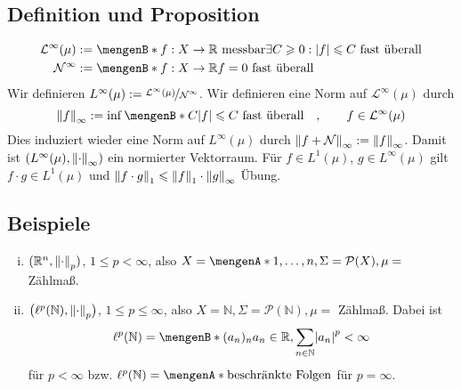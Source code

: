 \subsection[Definition und Proposition: Der normierte Raum $L^\infty(\mu)$ und ]{Definition und Proposition} %
\label{sub:48}
\begin{align*}
	\mathcal{L}^\infty(\mu) &:= \set[f : X \to \mathds{R} \text{ messbar}]{\exists C \ge 0 : \abs*{f} \le C \text{ fast überall} \rule{0cm}{0.7em} }  \\
	\mathcal{N}^\infty &:= \set[f : X \to \mathds{R}]{f=0 \text{ fast überall}} 
\end{align*}
Wir definieren $L^\infty(\mu) := \nicefrac{\mathcal{L}^\infty(\mu)}{\mathcal{N}^\infty}$. Wir definieren eine Norm auf $\mathcal{L}^\infty(\mu)$ durch
\[
	\norm[\infty]{f} := \inf \set[C]{\abs*{f} \le C \text{ fast überall} }\quad , \qquad f \in \mathcal{L}^\infty(\mu)  
\]
Dies induziert wieder eine Norm auf $L^\infty(\mu)$ durch $\norm[\infty]{f + \mathcal{N}} := \norm[\infty]{f}$. Damit ist $\enbrace*{L^\infty(\mu), \norm[\infty]{\cdot}}$
ein normierter Vektorraum. Für $f \in L^1(\mu)$, $g \in L^\infty(\mu)$ gilt $f \cdot g \in L^1(\mu)$ und $\norm[1]{f \cdot g} \le \norm[1]{f} \cdot \norm[\infty]{g}$
Übung. \bewende

\subsection[Beispiele für $L^p$-Räume]{Beispiele} %
\label{sub:49}
\begin{enumerate}[(i)]
	\item $(\mathds{R}^n, \norm[p]{\cdot})$, $1 \le p < \infty$, also $X=\set{1,\ldots,n}, \Sigma=\mathcal{P}(X), \mu =$ Zählmaß.
	\item $\enbrace[\big]{\ell^p(\mathds{N}), \norm[p]{\cdot }}$, $1 \le p \le \infty$, also $X=\mathds{N}, \Sigma=\mathcal{P}(\mathds{N}), \mu=$ Zählmaß.
	Dabei ist 
	\[
		\ell^p(\mathds{N}) = \set[(a_n)_n]{a_n \in \mathds{R}, \sum_{n \in \mathds{N}} \abs*{a_n}^p < \infty} 
	\]
	für $p < \infty$ bzw. $\ell^p(\mathds{N})= \set{\text{beschränkte Folgen}}$ für $p=\infty$.
\end{enumerate}

